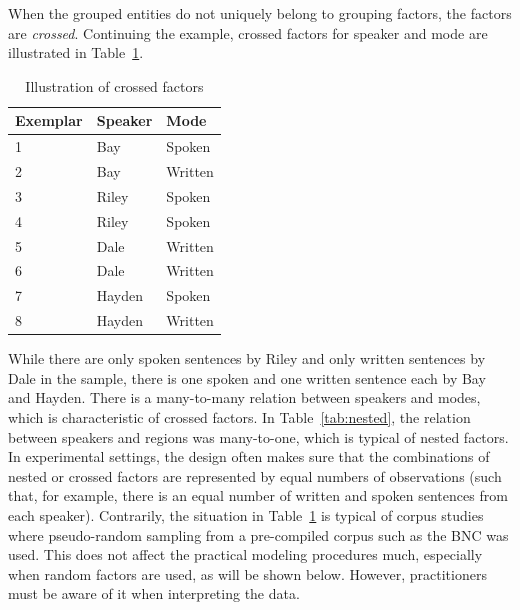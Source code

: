 \documentclass[a4paper,12pt]{article}
\begin{document}
When the grouped entities do not uniquely belong to grouping factors, the factors are \textit{crossed}.
Continuing the example, crossed factors for speaker and mode are illustrated in Table~\ref{tab:crossed}.
%
\begin{table}
  \centering
  \begin{tabular}{lll}
    \toprule
    \textbf{Exemplar} & \textbf{Speaker}  & \textbf{Mode}   \\
    \midrule
                    1 &           Bay    &         Spoken  \\
                    2 &           Bay    &         Written \\
                    3 &           Riley  &         Spoken  \\
                    4 &           Riley  &         Spoken  \\
                    5 &           Dale   &         Written \\
                    6 &           Dale   &         Written \\
                    7 &           Hayden &         Spoken  \\
                    8 &           Hayden &         Written \\
    \bottomrule
  \end{tabular}
  \caption{Illustration of crossed factors}
  \label{tab:crossed}
\end{table}
%
While there are only spoken sentences by Riley and only written sentences by Dale in the sample, there is one spoken and one written sentence each by Bay and Hayden.
There is a many-to-many relation between speakers and modes, which is characteristic of crossed factors.
In Table~\ref{tab:nested}, the relation between speakers and regions was many-to-one, which is typical of nested factors.
In experimental settings, the design often makes sure that the combinations of nested or crossed factors are represented by equal numbers of observations (such that, for example, there is an equal number of written and spoken sentences from each speaker).
Contrarily, the situation in Table~\ref{tab:crossed} is typical of corpus studies where pseudo-random sampling from a pre-compiled corpus such as the BNC was used.
This does not affect the practical modeling procedures much, especially when random factors are used, as will be shown below.
However, practitioners must be aware of it when interpreting the data.
\end{document}
